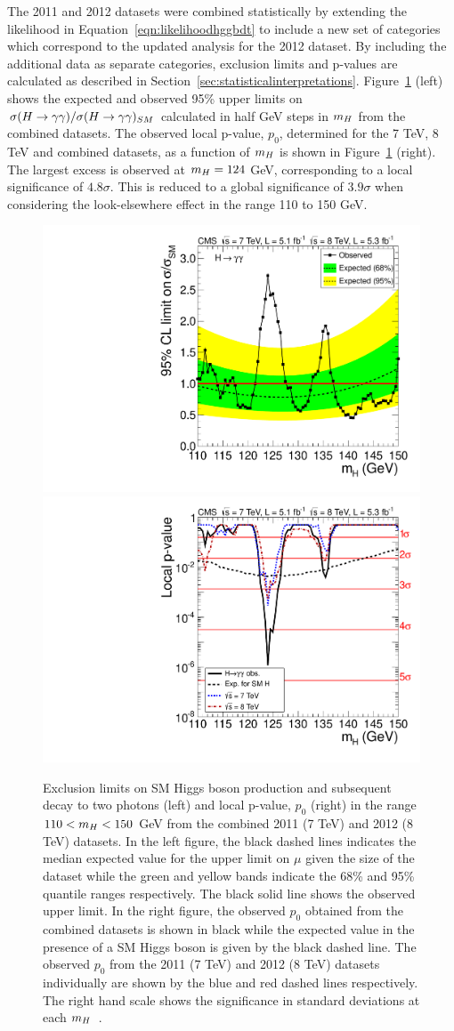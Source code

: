 The 2011 and 2012 datasets were combined statistically by extending the likelihood in 
Equation~\ref{eqn:likelihoodhggbdt}
to include a new set of categories which correspond to the updated analysis for the 2012 dataset.
By including the additional data as separate categories, 
exclusion limits and p-values are calculated as described in Section~\ref{sec:statisticalinterpretations}.
Figure~\ref{fig:limits8TeV} (left) shows the expected and observed 95\% upper limits 
on $\sigma(H\rightarrow\gamma\gamma)/\sigma(H\rightarrow\gamma\gamma)_{SM}$ calculated in half GeV steps in $m_{H}$
from the combined datasets. The observed local p-value, $p_{0}$, determined
for the 7 TeV, 8 TeV and combined datasets, as a function of $m_{H}$ is shown in Figure~\ref{fig:limits8TeV} (right).
The largest excess is observed at $m_{H}=124$ GeV, corresponding to a local significance of $4.8\sigma$.
This is reduced to a global significance of $3.9\sigma$ when considering the look-elsewhere effect in 
the range 110 to 150 GeV.

\begin{figure}
\begin{center}
  \includegraphics[width=.49\textwidth]{hgg8TeV/hgg_MassWindowLimit.pdf}
  \includegraphics[width=.49\textwidth]{hgg8TeV/hgg_MassWindowPValue.pdf}
\end{center}
 \caption{Exclusion limits on SM Higgs boson production and subsequent decay to two photons
(left) and local p-value, $p_{0}$ (right) in the range
 $110 < m_{H} < 150$ GeV from the combined 2011 (7 TeV) and 2012 (8 TeV) datasets. 
 In the left figure, the black dashed lines indicates 
 the median expected value for the upper limit on $\mu$ 
 given the size of the dataset while the green and yellow bands indicate 
 the 68\% and 95\% quantile ranges respectively.
 The black solid line shows the observed upper limit.
 In the right figure, the observed $p_{0}$ obtained from the combined 
 datasets is shown in black while the expected value in the presence of a
 SM Higgs boson is given by the black dashed line. The observed $p_{0}$ from the 2011 (7 TeV) 
 and 2012 (8 TeV) datasets individually are shown by the 
 blue and red dashed lines respectively. The right hand scale shows the significance in 
 standard deviations at each $m_{H}$~\citep{HIG-12-036}.}
 \label{fig:limits8TeV}
\end{figure}


